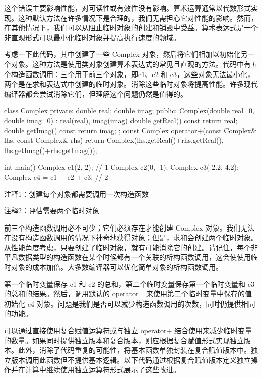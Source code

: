 这个错误主要影响性能，对可读性或有效性没有影响。算术运算通常以代数形式实现。这种默认方法在许多情况下是合理的，我们无需担心它对性能的影响。然而，在其他情况下，我们可以从阻止临时对象的创建和销毁中受益。算术表达式是一个非直观形式可以最小化临时对象并提高执行速度的领域。


考虑一下此代码，其中创建了一些 Complex 对象，然后将它们相加以初始化另一个对象。这种方法是使用类对象创建算术表达式的常见且直观的方法。代码中有五个构造函数调用：三个用于前三个对象，即c1、c2 和 c3，这些对象无法最小化，两个是在求和表达式中创建的临时对象。消除这些临时对象将提高性能。许多现代编译器都会尝试消除它们，但理解这个问题仍然是值得的。


\begin{cpp}
class Complex {
private:
  double real;
  double imag;
public:
  Complex(double real=0, double imag=0) : real(real), imag(imag) {}
  double getReal() const { return real; }
  double getImag() const { return imag; }
};
const Complex operator+(const Complex& lhs, const Complex& rhs) {
  return Complex(lhs.getReal()+rhs.getReal(), lhs.getImag()+rhs.getImag());
}

int main() {
  Complex c1(2, 2); // 1
  Complex c2(0, -1);
  Complex c3(-2.2, 4.2);
  Complex c4 = c1 + c2 + c3; // 2
}
\end{cpp}

{\footnotesize
注释1：创建每个对象都需要调用一次构造函数

注释2：评估需要两个临时对象
}


前三个构造函数调用必不可少；它们必须存在才能创建 Complex 对象。我们无法在没有构造函数调用的情况下神奇地获得对象；但是，求和会创建两个临时对象。从性能角度考虑，只要创建了临时对象，就有可能消除它的创建。请记住，每个非平凡数据类型的构造函数在某个时候都有一个关联的析构函数调用，这会使使用临时对象的成本加倍。大多数编译器可以优化简单对象的析构函数调用。

第一个临时变量保存 c1 和 c2 的总和，第二个临时变量保存第一个临时变量和 c3 的总和的结果。然后，调用默认的 operator= 来使用第二个临时变量中保存的值初始化 c4 对象。问题是我们是否可以减少构造函数调用的次数，同时仍提供相同的功能。


可以通过直接使用复合赋值运算符或与独立 operator+ 结合使用来减少临时变量的数量。如果同时提供独立版本和复合版本，则应根据复合赋值形式实现独立版本。此外，消除了代码重复的可能性，将基本函数单独封装在复合赋值版本中。独立版本调用此函数但不提供基本逻辑。以下代码通过根据复合赋值版本定义独立操作并在计算中继续使用独立运算符形式展示了这些改进。

